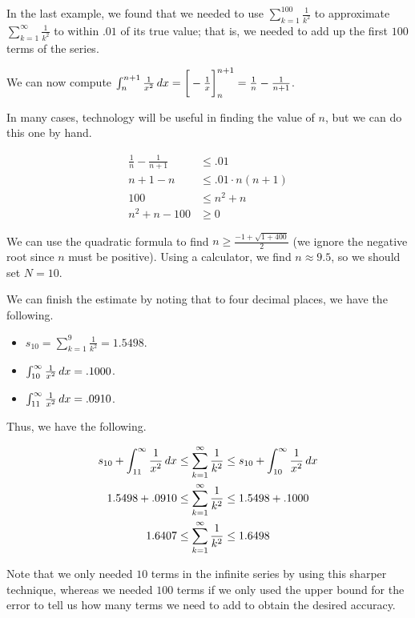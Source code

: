 \documentclass{ximera}
\begin{document}
\begin{model}
In the last example, we found that we needed to use $\sum_{k=1}^{100} \frac{1}{k^2}$ to approximate $\sum_{k=1}^{\infty} \frac{1}{k^2} $ to within $.01$ of its true value; that is, we needed to add up the first $100$ terms of the series.  

We can now compute $\int_n^{n+1} \frac{1}{x^2} \mathop{}\!d x  = \bigg[  -\frac{1}{x}  \bigg]_n^{n+1} = \frac{1}{n}-\frac{1}{n+1}$.

In many cases, technology will be useful in finding the value of $n$, but we can do this one by hand.

\begin{align*}
\frac{1}{n}-\frac{1}{n+1} &\leq .01\\
n+1 - n &\leq .01\cdot n(n+1) \\
100 & \leq n^2+n \\
n^2+n-100 &\geq 0
\end{align*}

We can use the quadratic formula to find $n \geq \frac{-1+\sqrt{1+400}}{2}$ (we ignore the negative root since $n$ must be positive).  Using a calculator, we find $n \approx 9.5$, so we should set $N=10$.

We can finish the estimate by noting that to four decimal places, we have the following.

\begin{itemize}
\item $s_{10} = \sum_{k=1}^{9} \frac{1}{k^2} = 1.5498$.
\item $\int_{10}^\infty \frac{1}{x^2} \mathop{}\!d x = .1000$.
\item $\int_{11}^\infty \frac{1}{x^2} \mathop{}\!d x = .0910$.
\end{itemize}

Thus, we have the following.

\begin{align*}
s_{10} + \int_{11}^\infty \frac{1}{x^2} \mathop{}\!d x & \leq   \sum_{k=1}^{\infty} \frac{1}{k^2} \leq s_{10} + \int_{10}^\infty \frac{1}{x^2} \mathop{}\!d x \\
1.5498 + .0910 & \leq  \sum_{k=1}^{\infty} \frac{1}{k^2} \leq 1.5498 + .1000 \\
1.6407 & \leq  \sum_{k=1}^{\infty} \frac{1}{k^2} \leq 1.6498
\end{align*}

Note that we only needed $10$ terms in the infinite series by using this sharper technique, whereas we needed $100$ terms if we only used the upper bound for the error to tell us how many terms we need to add to obtain the desired accuracy.
\end{model}
\end{document}
